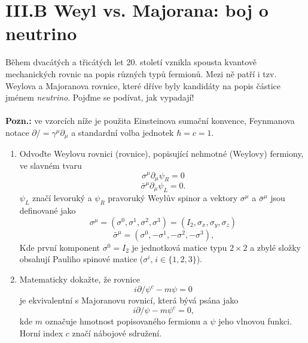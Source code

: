 \documentclass{../../../../style/mkimain}
\begin{document}
\section*{III.B Weyl vs. Majorana: boj o neutrino}
\noindent
Během dvacátých a třicátých let 20. století vznikla spousta kvantově mechanických rovnic na popis různých typů fermionů. Mezi ně patří i tzv.
Weylova a Majoranova rovnice, které dříve byly kandidáty na popis částice jménem \emph{neutrino}. Pojďme se podívat, jak vypadají!
\\
\\
\textbf{Pozn.:} ve vzorcích níže je použita Einsteinova sumační konvence, Feynmanova  notace $\partial\!\!\!/=\gamma^\mu \partial_\mu$
a standardní volba jednotek $\hbar=c=1$.
\begin{enumerate}
    \item Odvoďte Weylovu rovnici (rovnice), popisující nehmotné (Weylovy) fermiony, ve slavném tvaru
    $$
    \sigma^\mu \partial_\mu \psi_R = 0
    $$
    $$
    \bar{\sigma}^\mu \partial_\mu \psi_L = 0 \text{.}
    $$
    $\psi_L$ značí levoruký a $\psi_R$ pravoruký Weylův spinor a vektory $\sigma^\mu$ a $\bar{\sigma}^\mu$ jsou definované jako
    $$\sigma^\mu = \left(\sigma^0, \sigma^1, \sigma^2, \sigma^3\right) = \left(I_2, \sigma_x, \sigma_y, \sigma_z\right)$$
    $$\bar{\sigma}^\mu = \left(\sigma^0, -\sigma^1, -\sigma^2, -\sigma^3\right)\text{,}$$
    Kde první komponent $\sigma^0=I_2$ je jednotková matice typu $2\times2$ a
    zbylé složky obsahují Pauliho spinové matice ($\sigma^i\text{,}\;i\in \{1,2,3\}$).
    
    \item Matematicky dokažte, že rovnice
    $$i\partial\!\!\!/\psi^c-m\psi=0$$
    je ekvivalentní s Majoranovu rovnicí, která bývá psána jako
    $$i\partial\!\!\!/\psi-m\psi^c=0\text{,}$$
    kde $m$ označuje hmotnost popisovaného fermionu a $\psi$ jeho vlnovou funkci. Horní index $c$ značí nábojové sdružení.
\end{enumerate}
\end{document}
